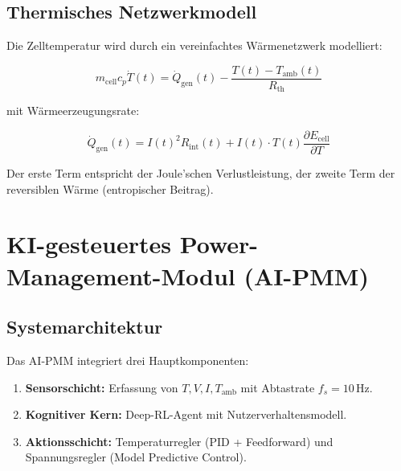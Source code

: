 ﻿\documentclass[12pt,a4paper]{article}
\begin{document}
	\subsection{Thermisches Netzwerkmodell}
	
	Die Zelltemperatur wird durch ein vereinfachtes Wärmenetzwerk modelliert:
	
	\begin{equation}
		m_\mathrm{cell} c_p \dot{T}(t) = \dot{Q}_\mathrm{gen}(t) - \frac{T(t) - T_\mathrm{amb}(t)}{R_\mathrm{th}}
		\label{eq:thermal_model}
	\end{equation}
	
	mit Wärmeerzeugungsrate:
	
	\begin{equation}
		\dot{Q}_\mathrm{gen}(t) = I(t)^2 R_\mathrm{int}(t) +
		I(t)\cdot T(t)\frac{\partial E_\mathrm{cell}}{\partial T}
		\label{eq:heat_gen}
	\end{equation}
	
	Der erste Term entspricht der Joule'schen Verlustleistung, der zweite Term
	der reversiblen Wärme (entropischer Beitrag).
	
	\section{KI-gesteuertes Power-Management-Modul (AI-PMM)}
	\label{sec:ai_pmm}
	
	\subsection{Systemarchitektur}
	
	Das AI-PMM integriert drei Hauptkomponenten:
	
	\begin{enumerate}[leftmargin=*, label=(\Roman*)]
		\item \textbf{Sensorschicht:} Erfassung von $T, V, I, T_\mathrm{amb}$
		mit Abtastrate $f_s = 10\,\mathrm{Hz}$.
		\item \textbf{Kognitiver Kern:} Deep-RL-Agent mit Nutzerverhaltensmodell.
		\item \textbf{Aktionsschicht:} Temperaturregler (PID + Feedforward) und
		Spannungsregler (Model Predictive Control).
	\end{enumerate}
	
\end{document}
